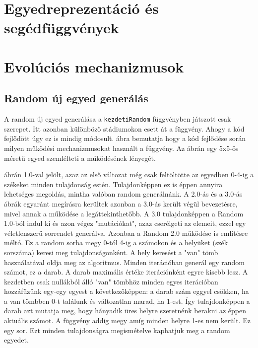 \documentclass[12ppt,a4paper,oneside]{report}
\begin{document}
    \section{Egyedreprezentáció és segédfüggvények} %

    \section{Evolúciós mechanizmusok} %
        
        \subsection{Random új egyed generálás} %
        
         A random új egyed generálása a \texttt{kezdetiRandom} függvényben játszott csak szerepet.
         Itt azonban különböző stádiumokon esett át a függvény. Ahogy a kód fejlődött úgy ez is mindig módosult.
          ábra bemutatja hogy a kód fejlődése során milyen működési mechanizmusokat használt a függvény.
         Az ábrán egy 5x5-ös méretű egyed szemlélteti a működésének lényegét.
         
           
          ábrán 1.0-val jelölt, azaz az első változat még csak feltöltötte az egyedben 0-4-ig a székeket minden tulajdonság estén.
         Tulajdonképpen ez is éppen annyira lehetséges megoldás, mintha valóban random generálnánk.
         A 2.0-ás és a 3.0-ás ábrák egyaránt megírásra kerültek azonban a 3.0-ás került végül bevezetésre, mivel annak a működése a legáttekinthetőbb.
         A 3.0 tulajdonképpen a Random 1.0-ból indul ki és azon végez "mutációkat", azaz cserélgeti az elemeit, ezzel egy véletlenszerű sorrendet generálva.
         Azonban a Random 2.0 működése is említésre méltó.
         Ez a random sorba megy 0-tól 4-ig a számokon és a helyüket (szék sorszáma) keresi meg tulajdonságonként.
         A hely keresést a "van" tömb használatával oldja meg az algoritmus.
         Minden iterációban generál egy random számot, ez a darab.
         A darab maximális értéke iterációnként egyre kisebb lesz.
         A kezdetben csak nullákból álló "van" tömbhöz minden egyes iterációban hozzáfűzünk egy-egy egyest a következőképpen: a darab szám eggyel csökken, ha a van tömbben 0-t találunk és változatlan marad, ha 1-est.
         Így tulajdonképpen a darab azt mutatja meg, hogy hányadik üres helyre szeretnénk berakni az éppen aktuális számot.
         A függvény addig megy amíg minden helyre 1-es nem került.
         Ez egy sor.
         Ezt minden tulajdonságra megismételve kaphatjuk meg a random egyedet.
            
\end{document}
